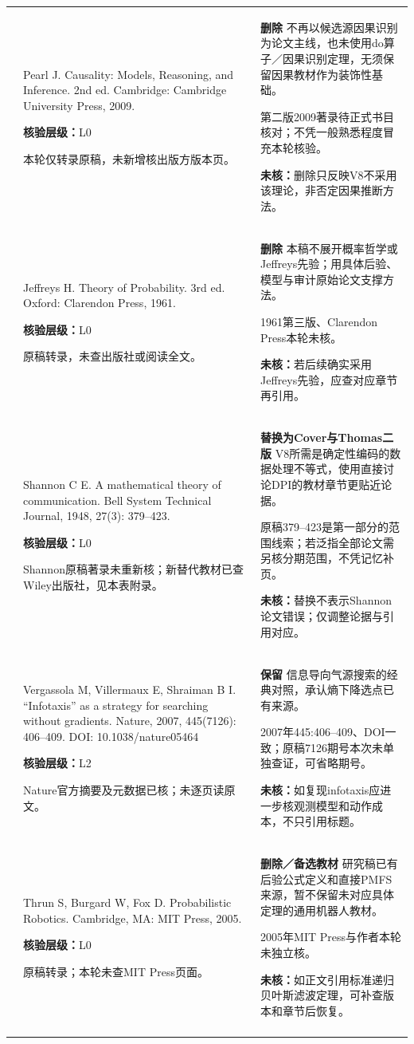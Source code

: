 \begin{longtable}{@{}>{\raggedright\arraybackslash}p{0.7cm}>{\raggedright\arraybackslash}p{7.0cm}>{\raggedright\arraybackslash}p{7.8cm}@{}}
29 & Pearl J. Causality: Models, Reasoning, and Inference. 2nd ed. Cambridge: Cambridge University Press, 2009.\par\textbf{核验层级：}L0\par 本轮仅转录原稿，未新增核出版方版本页。 & \textbf{删除} 不再以候选源因果识别为论文主线，也未使用do算子／因果识别定理，无须保留因果教材作为装饰性基础。\par 第二版2009著录待正式书目核对；不凭一般熟悉程度冒充本轮核验。\par\textbf{未核：}删除只反映V8不采用该理论，非否定因果推断方法。 \\\addlinespace[6pt]
30 & Jeffreys H. Theory of Probability. 3rd ed. Oxford: Clarendon Press, 1961.\par\textbf{核验层级：}L0\par 原稿转录，未查出版社或阅读全文。 & \textbf{删除} 本稿不展开概率哲学或Jeffreys先验；用具体后验、模型与审计原始论文支撑方法。\par 1961第三版、Clarendon Press本轮未核。\par\textbf{未核：}若后续确实采用Jeffreys先验，应查对应章节再引用。 \\\addlinespace[6pt]
31 & Shannon C E. A mathematical theory of communication. Bell System Technical Journal, 1948, 27(3): 379–423.\par\textbf{核验层级：}L0\par Shannon原稿著录未重新核；新替代教材已查Wiley出版社，见本表附录。 & \textbf{替换为Cover与Thomas二版} V8所需是确定性编码的数据处理不等式，使用直接讨论DPI的教材章节更贴近论据。\par 原稿379–423是第一部分的范围线索；若泛指全部论文需另核分期范围，不凭记忆补页。\par\textbf{未核：}替换不表示Shannon论文错误；仅调整论据与引用对应。 \\\addlinespace[6pt]
32 & Vergassola M, Villermaux E, Shraiman B I. ``Infotaxis'' as a strategy for searching without gradients. Nature, 2007, 445(7126): 406–409. DOI: 10.1038/nature05464\par\textbf{核验层级：}L2\par Nature官方摘要及元数据已核；未逐页读原文。 & \textbf{保留} 信息导向气源搜索的经典对照，承认熵下降选点已有来源。\par 2007年445:406–409、DOI一致；原稿7126期号本次未单独查证，可省略期号。\par\textbf{未核：}如复现infotaxis应进一步核观测模型和动作成本，不只引用标题。 \\\addlinespace[6pt]
33 & Thrun S, Burgard W, Fox D. Probabilistic Robotics. Cambridge, MA: MIT Press, 2005.\par\textbf{核验层级：}L0\par 原稿转录；本轮未查MIT Press页面。 & \textbf{删除／备选教材} 研究稿已有后验公式定义和直接PMFS来源，暂不保留未对应具体定理的通用机器人教材。\par 2005年MIT Press与作者本轮未独立核。\par\textbf{未核：}如正文引用标准递归贝叶斯滤波定理，可补查版本和章节后恢复。 \\\addlinespace[6pt]

\end{longtable}
